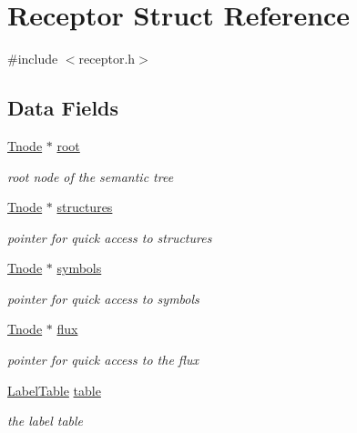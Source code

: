 \hypertarget{structReceptor}{\section{Receptor Struct Reference}
\label{structReceptor}
}


{\ttfamily \#include $<$receptor.\+h$>$}

\subsection*{Data Fields}
\begin{DoxyCompactItemize}
\item 
\hypertarget{structReceptor_a7a280e923e97768c67f90303bcf8c152}{\hyperlink{structTnode}{Tnode} $\ast$ \hyperlink{structReceptor_a7a280e923e97768c67f90303bcf8c152}{root}}\label{structReceptor_a7a280e923e97768c67f90303bcf8c152}

\begin{DoxyCompactList}\small\item\em root node of the semantic tree \end{DoxyCompactList}\item 
\hypertarget{structReceptor_a81c4e6049350d0577334fdda48f4260a}{\hyperlink{structTnode}{Tnode} $\ast$ \hyperlink{structReceptor_a81c4e6049350d0577334fdda48f4260a}{structures}}\label{structReceptor_a81c4e6049350d0577334fdda48f4260a}

\begin{DoxyCompactList}\small\item\em pointer for quick access to structures \end{DoxyCompactList}\item 
\hypertarget{structReceptor_aeb5c0f81a92048d264308e7610ac39a3}{\hyperlink{structTnode}{Tnode} $\ast$ \hyperlink{structReceptor_aeb5c0f81a92048d264308e7610ac39a3}{symbols}}\label{structReceptor_aeb5c0f81a92048d264308e7610ac39a3}

\begin{DoxyCompactList}\small\item\em pointer for quick access to symbols \end{DoxyCompactList}\item 
\hypertarget{structReceptor_a622c4885a917e9249fa213ccf47b04ff}{\hyperlink{structTnode}{Tnode} $\ast$ \hyperlink{structReceptor_a622c4885a917e9249fa213ccf47b04ff}{flux}}\label{structReceptor_a622c4885a917e9249fa213ccf47b04ff}

\begin{DoxyCompactList}\small\item\em pointer for quick access to the flux \end{DoxyCompactList}\item 
\hypertarget{structReceptor_a2f7dc587ff971db209316cde561d0cd0}{\hyperlink{structtable__elem}{Label\+Table} \hyperlink{structReceptor_a2f7dc587ff971db209316cde561d0cd0}{table}}\label{structReceptor_a2f7dc587ff971db209316cde561d0cd0}

\begin{DoxyCompactList}\small\item\em the label table \end{DoxyCompactList}\end{DoxyCompactItemize}


